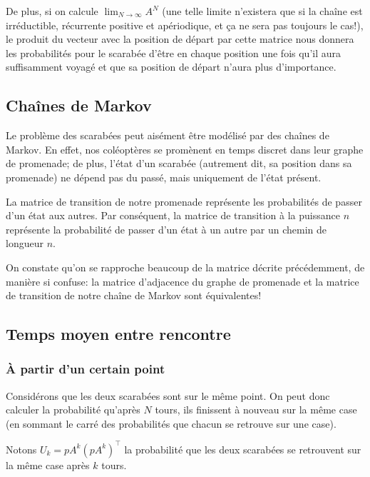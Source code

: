 \documentclass{scrartcl}
\begin{document}
  De plus, si on calcule $\lim_{N \to \infty} A^N$ (une telle limite n'existera
  que si la chaîne est irréductible, récurrente positive et apériodique, et ça
  ne sera pas toujours le cas!), le produit du vecteur avec la position de
  départ par cette matrice nous donnera les probabilités pour le scarabée
  d'être en chaque position une fois qu'il aura suffisamment voyagé et que sa
  position de départ n'aura plus d'importance.

  \subsection{Chaînes de Markov}
    Le problème des scarabées peut aisément être modélisé
    par des chaînes de Markov. En effet, nos coléoptères se promènent en temps
    discret dans leur graphe de promenade; de plus, l'état d'un scarabée
    (autrement dit, sa position dans sa promenade) ne dépend pas du passé, mais
    uniquement de l'état présent.

    La matrice de transition de notre promenade représente les probabilités de
    passer d'un état aux autres. Par conséquent, la matrice de transition à la
    puissance $n$ représente la probabilité de passer d'un état à un autre par
    un chemin de longueur $n$.

    On constate qu'on se rapproche beaucoup de la matrice décrite précédemment,
    de manière si confuse: la matrice d'adjacence du graphe de promenade et la
    matrice de transition de notre chaîne de Markov sont équivalentes!

  \subsection{Temps moyen entre rencontre}
    \subsubsection{À partir d'un certain point}
      Considérons que les deux scarabées sont sur le même point.  On peut donc
      calculer la probabilité qu'après $N$ tours, ils finissent à nouveau sur
      la même case (en sommant le carré des probabilités que chacun se retrouve
      sur une case).

      Notons $U_k = pA^k(pA^k)^\intercal$ la probabilité que les deux scarabées
      se retrouvent sur la même case après $k$ tours.
\end{document}
